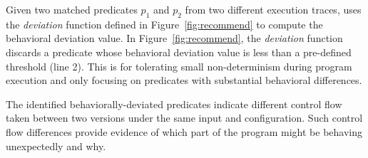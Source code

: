 Given two matched predicates $p_{1}$ and $p_{2}$ from two different execution traces,
\ourtool uses the \textit{deviation} function defined in Figure~\ref{fig:recommend}
to compute the behavioral deviation value.
In Figure~\ref{fig:recommend}, the \textit{deviation} function
 discards a predicate whose behavioral deviation value is less than
a pre-defined threshold (line 2). This is for tolerating small non-determinism
during program execution and only focusing on predicates with substantial
behavioral differences.

The identified behaviorally-deviated predicates indicate different
control flow taken between two versions under the same input
and configuration. Such control flow differences provide evidence of
which part of the program might be behaving unexpectedly and why.






